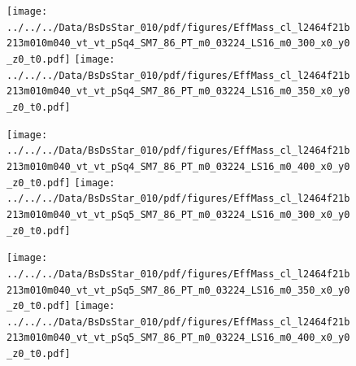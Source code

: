 \documentclass[a4paper,10pt]{article}
\begin{document}
\clearpage
\begin{figure}[p]
 \texttt{[image: ../../../Data/BsDsStar\_010/pdf/figures/EffMass\_cl\_l2464f21b213m010m040\_vt\_vt\_pSq4\_SM7\_86\_PT\_m0\_03224\_LS16\_m0\_300\_x0\_y0\_z0\_t0.pdf]} 
 \texttt{[image: ../../../Data/BsDsStar\_010/pdf/figures/EffMass\_cl\_l2464f21b213m010m040\_vt\_vt\_pSq4\_SM7\_86\_PT\_m0\_03224\_LS16\_m0\_350\_x0\_y0\_z0\_t0.pdf]} 
 \end{figure}
\begin{figure}[p]
 \texttt{[image: ../../../Data/BsDsStar\_010/pdf/figures/EffMass\_cl\_l2464f21b213m010m040\_vt\_vt\_pSq4\_SM7\_86\_PT\_m0\_03224\_LS16\_m0\_400\_x0\_y0\_z0\_t0.pdf]} 
 \texttt{[image: ../../../Data/BsDsStar\_010/pdf/figures/EffMass\_cl\_l2464f21b213m010m040\_vt\_vt\_pSq5\_SM7\_86\_PT\_m0\_03224\_LS16\_m0\_300\_x0\_y0\_z0\_t0.pdf]} 
 \end{figure}
\begin{figure}[p]
 \texttt{[image: ../../../Data/BsDsStar\_010/pdf/figures/EffMass\_cl\_l2464f21b213m010m040\_vt\_vt\_pSq5\_SM7\_86\_PT\_m0\_03224\_LS16\_m0\_350\_x0\_y0\_z0\_t0.pdf]} 
 \texttt{[image: ../../../Data/BsDsStar\_010/pdf/figures/EffMass\_cl\_l2464f21b213m010m040\_vt\_vt\_pSq5\_SM7\_86\_PT\_m0\_03224\_LS16\_m0\_400\_x0\_y0\_z0\_t0.pdf]} 
 \end{figure}
\clearpage
\clearpage
\end{document}
